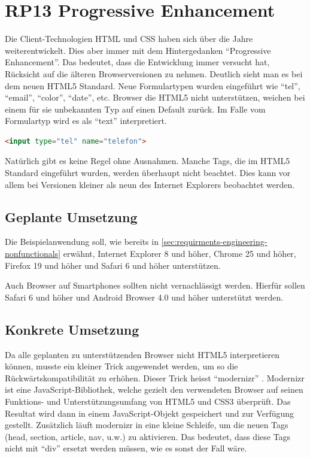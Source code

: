 \section{RP13 Progressive Enhancement}
\label{sec:principle-rp13-progressive-enhancement}

Die Client-Technologien HTML und CSS haben sich über die Jahre weiterentwickelt. Dies aber immer mit dem Hintergedanken ``Progressive Enhancement''. Das bedeutet, dass die Entwicklung immer versucht hat, Rücksicht auf die älteren Browserversionen zu nehmen.
Deutlich sieht man es bei dem neuen HTML5 Standard. Neue Formulartypen wurden eingeführt wie ``tel'', ``email'', ``color'', ``date'', etc. Browser die HTML5 nicht unterstützen, weichen bei einem für sie unbekannten Typ auf einen Default zurück. Im Falle vom Formulartyp wird es als ``text'' interpretiert.

\begin{lstlisting}[language=HTML, caption={Inputfeld in HTML5, welches eine Telefonnummer erwartet}, label={lst:html5TelInput}]
<input type="tel" name="telefon">
\end{lstlisting}

Natürlich gibt es keine Regel ohne Ausnahmen. Manche Tags, die im HTML5 Standard eingeführt wurden, werden überhaupt nicht beachtet. Dies kann vor allem bei Versionen kleiner als neun des Internet Explorers beobachtet werden.

\subsection*{Geplante Umsetzung}
Die Beispielanwendung soll, wie bereits in \ref{sec:requirments-engineering-nonfunctionals} erwähnt, Internet Explorer 8 und höher, Chrome 25 und höher, Firefox 19 und höher und Safari 6 und höher unterstützen.

Auch Browser auf Smartphones sollten nicht vernachlässigt werden. Hierfür sollen Safari 6 und höher und Android Browser 4.0 und höher unterstützt werden.

\subsection*{Konkrete Umsetzung}
Da alle geplanten zu unterstützenden Browser nicht HTML5 interpretieren können, musste ein kleiner Trick angewendet werden, um so die Rückwärtskompatibilität zu erhöhen. Dieser Trick heisst ``modernizr'' \cite{modernizr}. Modernizr ist eine JavaScript-Bibliothek, welche gezielt den verwendeten Browser auf seinen Funktions- und Unterstützungsumfang von HTML5 und CSS3 überprüft. Das Resultat wird dann in einem JavaScript-Objekt gespeichert und zur Verfügung gestellt.  Zusätzlich läuft modernizr in eine kleine Schleife, um die neuen Tags (head, section, article, nav, u.w.) zu aktivieren. Das bedeutet, dass diese Tags nicht mit ``div'' ersetzt werden müssen, wie es sonst der Fall wäre.


